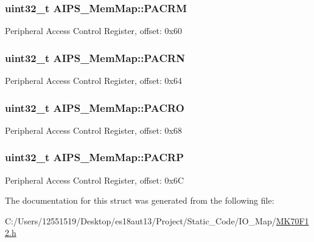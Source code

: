 \subsubsection[{P\+A\+C\+R\+M}]{\setlength{\rightskip}{0pt plus 5cm}uint32\+\_\+t A\+I\+P\+S\+\_\+\+Mem\+Map\+::\+P\+A\+C\+R\+M}\label{struct_a_i_p_s___mem_map_a30e7ebe0ffb0e9d97cbfa85d65e17cbb}
Peripheral Access Control Register, offset\+: 0x60 \hypertarget{struct_a_i_p_s___mem_map_a83bf08b950901b8f6d7ef2ceb960baa8}{}
\subsubsection[{P\+A\+C\+R\+N}]{\setlength{\rightskip}{0pt plus 5cm}uint32\+\_\+t A\+I\+P\+S\+\_\+\+Mem\+Map\+::\+P\+A\+C\+R\+N}\label{struct_a_i_p_s___mem_map_a83bf08b950901b8f6d7ef2ceb960baa8}
Peripheral Access Control Register, offset\+: 0x64 \hypertarget{struct_a_i_p_s___mem_map_a5892f2b025c43f875f1c88e3a8f6da30}{}
\subsubsection[{P\+A\+C\+R\+O}]{\setlength{\rightskip}{0pt plus 5cm}uint32\+\_\+t A\+I\+P\+S\+\_\+\+Mem\+Map\+::\+P\+A\+C\+R\+O}\label{struct_a_i_p_s___mem_map_a5892f2b025c43f875f1c88e3a8f6da30}
Peripheral Access Control Register, offset\+: 0x68 \hypertarget{struct_a_i_p_s___mem_map_af6d96671be0c664042ec003595ac405e}{}
\subsubsection[{P\+A\+C\+R\+P}]{\setlength{\rightskip}{0pt plus 5cm}uint32\+\_\+t A\+I\+P\+S\+\_\+\+Mem\+Map\+::\+P\+A\+C\+R\+P}\label{struct_a_i_p_s___mem_map_af6d96671be0c664042ec003595ac405e}
Peripheral Access Control Register, offset\+: 0x6\+C 

The documentation for this struct was generated from the following file\+:\begin{DoxyCompactItemize}
\item 
C\+:/\+Users/12551519/\+Desktop/es18aut13/\+Project/\+Static\+\_\+\+Code/\+I\+O\+\_\+\+Map/\hyperlink{_m_k70_f12_8h}{M\+K70\+F12.\+h}\end{DoxyCompactItemize}
